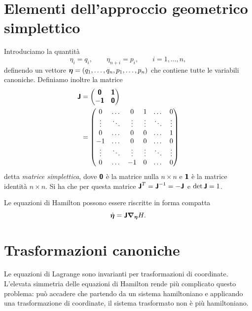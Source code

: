 \section{Elementi dell'approccio geometrico simplettico}
Introduciamo la quantità
\begin{equation*}
    \eta_i = q_i, \qquad \eta_{n+i} = p_i, \qquad i = 1, \dots, n,
\end{equation*}
definendo un vettore $\vb*{\eta} = (q_1, \dots, q_n, p_1, \dots, p_n)$ che contiene tutte le variabili canoniche. Definiamo inoltre la matrice
\begin{align*}
    \boldsymbol{\mathsf{J}} &= \begin{pmatrix}
        \boldsymbol{\mathsf{0}} & \boldsymbol{\mathsf{1}} \\
        -\boldsymbol{\mathsf{1}} & \boldsymbol{\mathsf{0}}
    \end{pmatrix} \\
    &= \begin{pmatrix}
        0 & \dots & 0 & 1 & \dots & 0 \\
        \vdots & \ddots & \vdots & \vdots & \ddots & \vdots \\
        0 & \dots & 0 & 0 & \dots & 1 \\
        -1 & \dots & 0 & 0 & \dots & 0 \\
        \vdots & \ddots & \vdots & \vdots & \ddots & \vdots \\
        0 & \dots & -1 & 0 & \dots & 0
    \end{pmatrix}
\end{align*}
detta \emph{matrice simplettica}, dove $\boldsymbol{\mathsf{0}}$ è la matrice nulla $n\times n$ e $\boldsymbol{\mathsf{1}}$ è la matrice identità $n\times n$. Si ha che per questa matrice $\boldsymbol{\mathsf{J}}^T = \boldsymbol{\mathsf{J}}^{-1} = -\boldsymbol{\mathsf{J}}$ e $\det \boldsymbol{\mathsf{J}} = 1$.

Le equazioni di Hamilton possono essere riscritte in forma compatta
\begin{equation*}
    \dot{\vb*{\eta}} = \boldsymbol{\mathsf{J}} \grad_{\vb*{\eta}} H.
\end{equation*}

\section{Trasformazioni canoniche}
Le equazioni di Lagrange sono invarianti per trasformazioni di coordinate. L'elevata simmetria delle equazioni di Hamilton rende più complicato questo problema: può accadere che partendo da un sistema hamiltoniano e applicando una trasformazione di coordinate, il sistema trasformato non è più hamiltoniano. 


